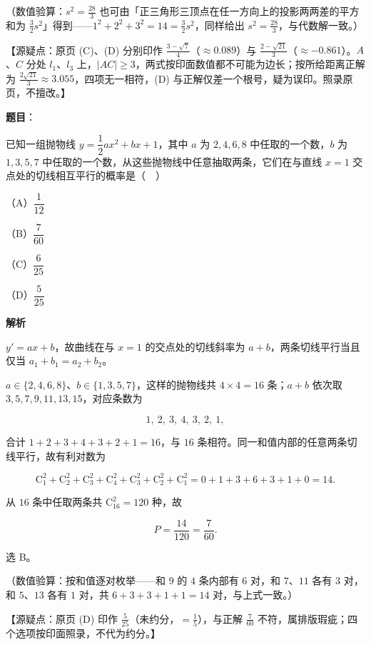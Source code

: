 \begin{answer}
（数值验算：$s^{2}=\frac{28}{3}$ 也可由「正三角形三顶点在任一方向上的投影两两差的平方和为 $\frac32s^{2}$」得到——$1^{2}+2^{2}+3^{2}=14=\frac32s^{2}$，同样给出 $s^{2}=\frac{28}{3}$，与代数解一致。）

【源疑点：原页 (C)、(D) 分别印作 $\frac{3-\sqrt7}{4}$（$\approx0.089$）与 $\frac{2-\sqrt{21}}{3}$（$\approx-0.861$）。$A$、$C$ 分处 $l_1$、$l_3$ 上，$|AC|\geqslant3$，两式按印面数值都不可能为边长；按所给距离正解为 $\frac{2\sqrt{21}}{3}\approx3.055$，四项无一相符，(D) 与正解仅差一个根号，疑为误印。照录原页，不擅改。】


\end{answer}
\begin{answer}

\textbf{题目}：

已知一组抛物线 $y=\dfrac12ax^2+bx+1$，其中 $a$ 为 $2,4,6,8$ 中任取的一个数，$b$ 为 $1,3,5,7$ 中任取的一个数，从这些抛物线中任意抽取两条，它们在与直线 $x=1$ 交点处的切线相互平行的概率是（　）

（A）$\dfrac1{12}$

（B）$\dfrac{7}{60}$

（C）$\dfrac6{25}$

（D）$\dfrac5{25}$

\textbf{解析}

$y'=ax+b$，故曲线在与 $x=1$ 的交点处的切线斜率为 $a+b$，两条切线平行当且仅当 $a_1+b_1=a_2+b_2$。

$a\in\{2,4,6,8\}$、$b\in\{1,3,5,7\}$，这样的抛物线共 $4\times4=16$ 条；$a+b$ 依次取 $3,5,7,9,11,13,15$，对应条数为

\nopagebreak[4]
\[1,\ 2,\ 3,\ 4,\ 3,\ 2,\ 1,\]

合计 $1+2+3+4+3+2+1=16$，与 $16$ 条相符。同一和值内部的任意两条切线平行，故有利对数为

\nopagebreak[4]
\[\mathrm{C}_1^2+\mathrm{C}_2^2+\mathrm{C}_3^2+\mathrm{C}_4^2+\mathrm{C}_3^2+\mathrm{C}_2^2+\mathrm{C}_1^2=0+1+3+6+3+1+0=14 .\]

从 $16$ 条中任取两条共 $\mathrm{C}_{16}^{2}=120$ 种，故

\nopagebreak[4]
\[P=\frac{14}{120}=\frac{7}{60}.\]

选 B。

（数值验算：按和值逐对枚举——和 $9$ 的 $4$ 条内部有 $6$ 对，和 $7$、$11$ 各有 $3$ 对，和 $5$、$13$ 各有 $1$ 对，共 $6+3+3+1+1=14$ 对，与上式一致。）

【源疑点：原页 (D) 印作 $\frac{5}{25}$（未约分，$=\frac15$），与正解 $\frac{7}{60}$ 不符，属排版瑕疵；四个选项按印面照录，不代为约分。】


\end{answer}
